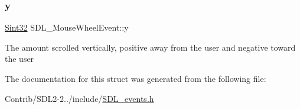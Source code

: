 \subsubsection{\texorpdfstring{y}{y}}
{\footnotesize\ttfamily \mbox{\hyperlink{_s_d_l__stdinc_8h_a7a90b941db9d4582e9ad7abb9940ff7e}{Sint32}} S\+D\+L\+\_\+\+Mouse\+Wheel\+Event\+::y}

The amount scrolled vertically, positive away from the user and negative toward the user 

The documentation for this struct was generated from the following file\+:\begin{DoxyCompactItemize}
\item 
Contrib/\+S\+D\+L2-\/2../include/\mbox{\hyperlink{_s_d_l__events_8h}{S\+D\+L\+\_\+events.\+h}}\end{DoxyCompactItemize}
